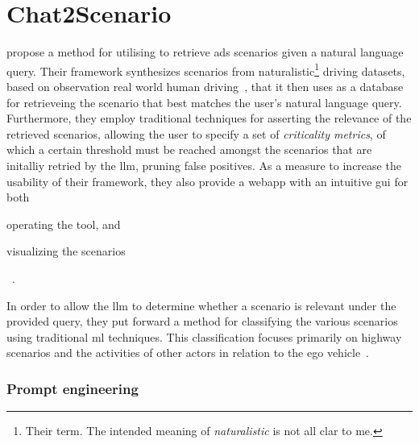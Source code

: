 \section{Chat2Scenario}

\citeauthor{chat2Scenario} propose a method for utilising  to retrieve
\acrshort{ads} scenarios given a natural language query. Their framework synthesizes scenarios from
naturalistic\footnote{Their term. The intended meaning of \textit{naturalistic} is not all clar to
    me.} driving datasets, based on observation real world human driving~\cite[55]{chat2Scenario}, that
it then uses as a database for retrieveing the scenario that best matches the user's natural
language query. Furthermore, they employ traditional techniques for asserting the relevance of the
retrieved scenarios, allowing the user to specify a set of \textit{criticality metrics}, of which a
certain threshold must be reached amongst the scenarios that are initalliy retried by the
\acrshort{llm}, pruning false positives. As a measure to increase the usability of their framework,
they also provide a webapp with an intuitive \acrshort{gui} for both \begin{inparaenum}
    \item operating the tool, and
    \item visualizing the scenarios \end{inparaenum}~\cite[560]{chat2Scenario}.

In order to allow the \acrshort{llm} to determine whether a scenario is relevant under the
provided query, they put forward a method for classifying the various scenarios using traditional
\acrshort{ml} techniques. This classification focuses primarily on highway scenarios and the
activities of other actors in relation to the ego vehicle~\cite[561-562]{chat2Scenario}.

\subsubsection*{Prompt engineering}


